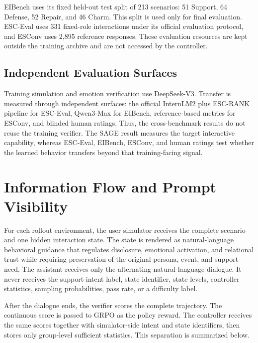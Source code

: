 EIBench uses its fixed held-out test split of 213 scenarios: 51 Support, 64
Defense, 52 Repair, and 46 Charm. This split is used only for final evaluation.
ESC-Eval uses 331 fixed-role interactions under its official evaluation
protocol, and ESConv uses 2,895 reference responses. These evaluation resources
are kept outside the training archive and are not accessed by the controller.

\subsection{Independent Evaluation Surfaces}
Training simulation and emotion verification use DeepSeek-V3. Transfer is
measured through independent surfaces: the official InternLM2 plus ESC-RANK
pipeline for ESC-Eval, Qwen3-Max for EIBench, reference-based metrics for
ESConv, and blinded human ratings. Thus, the cross-benchmark results do not
reuse the training verifier. The SAGE result measures the target interactive
capability, whereas ESC-Eval, EIBench, ESConv, and human ratings test whether
the learned behavior transfers beyond that training-facing signal.

\section{Information Flow and Prompt Visibility}
For each rollout environment, the user simulator receives the complete scenario
and one hidden interaction state. The state is rendered as natural-language
behavioral guidance that regulates disclosure, emotional activation, and
relational trust while requiring preservation of the original persona, event,
and support need. The assistant receives only the alternating natural-language
dialogue. It never receives the support-intent label, state identifier, state
levels, controller statistics, sampling probabilities, pass rate, or a
difficulty label.

After the dialogue ends, the verifier scores the complete trajectory. The
continuous score is passed to GRPO as the policy reward. The controller receives
the same scores together with simulator-side intent and state identifiers, then
stores only group-level sufficient statistics. This separation is summarized
below.

